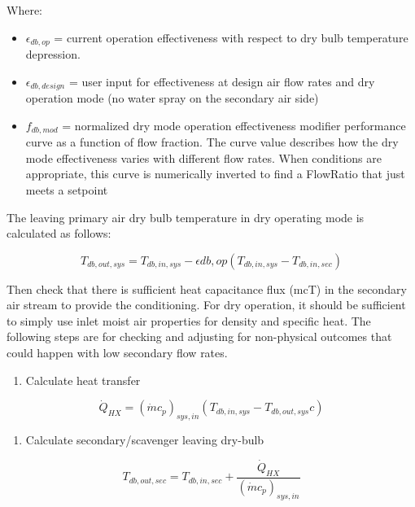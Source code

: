 Where:

\begin{itemize}
\item
  \(\epsilon_{db,op}\) = current operation effectiveness with respect to dry bulb temperature depression.
\item
  \(\epsilon_{db,design}\) = user input for effectiveness at design air flow rates and dry operation mode (no water spray on the secondary air side)
\item
  \(f_{db,mod}\) = normalized dry mode operation effectiveness modifier performance curve as a function of flow fraction. The curve value describes how the dry mode effectiveness varies with different flow rates. When conditions are appropriate, this curve is numerically inverted to find a FlowRatio that just meets a setpoint
\end{itemize}

The leaving primary air dry bulb temperature in dry operating mode is calculated as follows:

\begin{equation}
T_{db,out,sys} = T_{db,in,sys} - \epsilon{db,op}\left(T_{db,in,sys}-T_{db,in,sec}\right)
\end{equation}

Then check that there is sufficient heat capacitance flux (mcT) in the secondary air stream to provide the conditioning. For dry operation, it should be sufficient to simply use inlet moist air properties for density and specific heat. The following steps are for checking and adjusting for non-physical outcomes that could happen with low secondary flow rates.

\begin{enumerate}
\def\labelenumi{\arabic{enumi}.}
\tightlist
\item
  Calculate heat transfer
\end{enumerate}

\begin{equation}
\dot{Q}_{HX} = \left(\dot{m}c_{p}\right)_{sys,in} \left(T_{db,in,sys}-T_{db,out,sys}c\right)
\end{equation}

\begin{enumerate}
\def\labelenumi{\arabic{enumi}.}
\setcounter{enumi}{1}
\tightlist
\item
  Calculate secondary/scavenger leaving dry-bulb
\end{enumerate}

\begin{equation}
T_{db,out,sec} = T_{db,in,sec} + \frac{\dot{Q}_{HX}}{ \left(\dot{m}c_{p}\right)_{sys,in}}
\end{equation}

